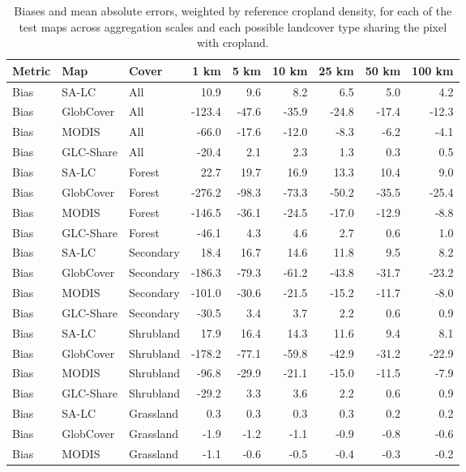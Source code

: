 \begin{longtable}{lllrrrrrr}
\caption{Biases and mean absolute errors, weighted by reference cropland density, for each of the test maps across aggregation scales and each possible landcover type sharing the pixel with cropland.} \\ 
  \hline
Metric & Map & Cover & 1 km & 5 km & 10 km & 25 km & 50 km & 100 km \\ 
  \hline
Bias & SA-LC & All & 10.9 & 9.6 & 8.2 & 6.5 & 5.0 & 4.2 \\ 
  Bias & GlobCover & All & -123.4 & -47.6 & -35.9 & -24.8 & -17.4 & -12.3 \\ 
  Bias & MODIS & All & -66.0 & -17.6 & -12.0 & -8.3 & -6.2 & -4.1 \\ 
  Bias & GLC-Share & All & -20.4 & 2.1 & 2.3 & 1.3 & 0.3 & 0.5 \\ 
  Bias & SA-LC & Forest & 22.7 & 19.7 & 16.9 & 13.3 & 10.4 & 9.0 \\ 
  Bias & GlobCover & Forest & -276.2 & -98.3 & -73.3 & -50.2 & -35.5 & -25.4 \\ 
  Bias & MODIS & Forest & -146.5 & -36.1 & -24.5 & -17.0 & -12.9 & -8.8 \\ 
  Bias & GLC-Share & Forest & -46.1 & 4.3 & 4.6 & 2.7 & 0.6 & 1.0 \\ 
  Bias & SA-LC & Secondary & 18.4 & 16.7 & 14.6 & 11.8 & 9.5 & 8.2 \\ 
  Bias & GlobCover & Secondary & -186.3 & -79.3 & -61.2 & -43.8 & -31.7 & -23.2 \\ 
  Bias & MODIS & Secondary & -101.0 & -30.6 & -21.5 & -15.2 & -11.7 & -8.0 \\ 
  Bias & GLC-Share & Secondary & -30.5 & 3.4 & 3.7 & 2.2 & 0.6 & 0.9 \\ 
  Bias & SA-LC & Shrubland & 17.9 & 16.4 & 14.3 & 11.6 & 9.4 & 8.1 \\ 
  Bias & GlobCover & Shrubland & -178.2 & -77.1 & -59.8 & -42.9 & -31.2 & -22.9 \\ 
  Bias & MODIS & Shrubland & -96.8 & -29.9 & -21.1 & -15.0 & -11.5 & -7.9 \\ 
  Bias & GLC-Share & Shrubland & -29.2 & 3.3 & 3.6 & 2.2 & 0.6 & 0.9 \\ 
  Bias & SA-LC & Grassland & 0.3 & 0.3 & 0.3 & 0.3 & 0.2 & 0.2 \\ 
  Bias & GlobCover & Grassland & -1.9 & -1.2 & -1.1 & -0.9 & -0.8 & -0.6 \\ 
  Bias & MODIS & Grassland & -1.1 & -0.6 & -0.5 & -0.4 & -0.3 & -0.2 \\ 

\end{longtable}
